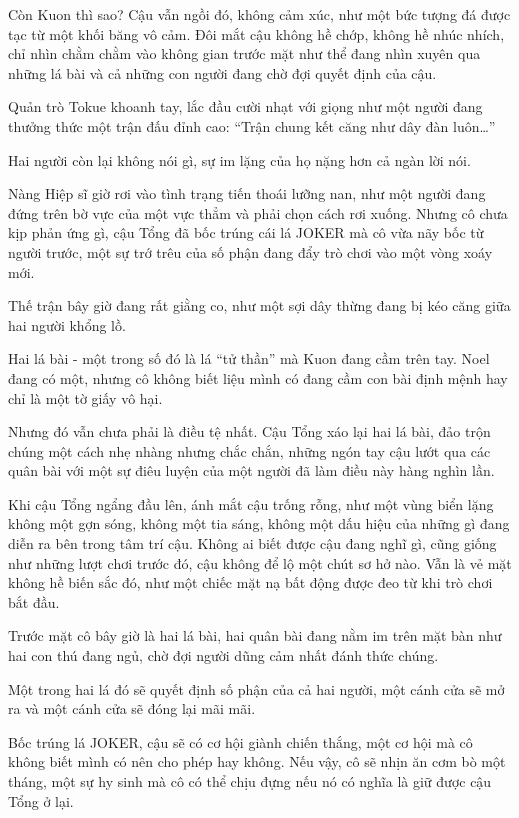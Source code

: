\documentclass[../main.tex]{subfiles}
\begin{document}
Còn Kuon thì sao? Cậu vẫn ngồi đó, không cảm xúc, như một bức tượng đá được tạc từ một khối băng vô cảm. Đôi mắt cậu không hề chớp, không hề nhúc nhích, chỉ nhìn chằm chằm vào không gian trước mặt như thể đang nhìn xuyên qua những lá bài và cả những con người đang chờ đợi quyết định của cậu.

Quản trò Tokue khoanh tay, lắc đầu cười nhạt với giọng như một người đang thưởng thức một trận đấu đỉnh cao: ``Trận chung kết căng như dây đàn luôn\dots''

Hai người còn lại không nói gì, sự im lặng của họ nặng hơn cả ngàn lời nói.

Nàng Hiệp sĩ giờ rơi vào tình trạng tiến thoái lưỡng nan, như một người đang đứng trên bờ vực của một vực thẳm và phải chọn cách rơi xuống. Nhưng cô chưa kịp phản ứng gì, cậu Tổng đã bốc trúng cái lá JOKER mà cô vừa nãy bốc từ người trước, một sự trớ trêu của số phận đang đẩy trò chơi vào một vòng xoáy mới.

Thế trận bây giờ đang rất giằng co, như một sợi dây thừng đang bị kéo căng giữa hai người khổng lồ.

Hai lá bài - một trong số đó là lá ``tử thần'' mà Kuon đang cầm trên tay. Noel đang có một, nhưng cô không biết liệu mình có đang cầm con bài định mệnh hay chỉ là một tờ giấy vô hại.

Nhưng đó vẫn chưa phải là điều tệ nhất. Cậu Tổng xáo lại hai lá bài, đảo trộn chúng một cách nhẹ nhàng nhưng chắc chắn, những ngón tay cậu lướt qua các quân bài với một sự điêu luyện của một người đã làm điều này hàng nghìn lần.

Khi cậu Tổng ngẩng đầu lên, ánh mắt cậu trống rỗng, như một vùng biển lặng không một gợn sóng, không một tia sáng, không một dấu hiệu của những gì đang diễn ra bên trong tâm trí cậu. Không ai biết được cậu đang nghĩ gì, cũng giống như những lượt chơi trước đó, cậu không để lộ một chút sơ hở nào. Vẫn là vẻ mặt không hề biến sắc đó, như một chiếc mặt nạ bất động được đeo từ khi trò chơi bắt đầu.

Trước mặt cô bây giờ là hai lá bài, hai quân bài đang nằm im trên mặt bàn như hai con thú đang ngủ, chờ đợi người dũng cảm nhất đánh thức chúng.

Một trong hai lá đó sẽ quyết định số phận của cả hai người, một cánh cửa sẽ mở ra và một cánh cửa sẽ đóng lại mãi mãi.

Bốc trúng lá JOKER, cậu sẽ có cơ hội giành chiến thắng, một cơ hội mà cô không biết mình có nên cho phép hay không. Nếu vậy, cô sẽ nhịn ăn cơm bò một tháng, một sự hy sinh mà cô có thể chịu đựng nếu nó có nghĩa là giữ được cậu Tổng ở lại.
\end{document}
